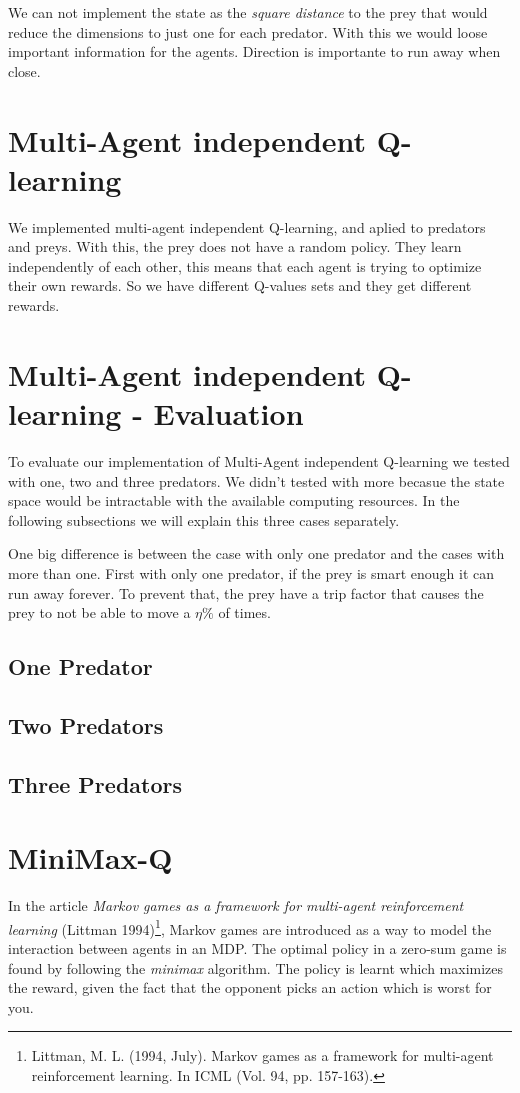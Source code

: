 \documentclass{article}
\begin{document}
We can not implement the state as the \emph{square distance} to the prey that
would reduce the dimensions to just one for each predator. With this we would
loose important information for the agents. Direction is importante to run away
when close.

\section{Multi-Agent independent Q-learning}
We implemented multi-agent independent Q-learning, and aplied to predators and
preys. With this, the prey does not have a random policy. They learn
independently of each other, this means that each agent is trying to optimize
their own rewards. So we have different Q-values sets and they get different
rewards.

\section{Multi-Agent independent Q-learning - Evaluation}
To evaluate our implementation of Multi-Agent independent Q-learning we tested
with one, two and three predators. We didn't tested with more becasue the state
space would be intractable with the available computing resources. In the
following subsections we will explain this three cases separately.

One big difference is between the case with only one predator and the cases with
more than one. First with only one predator, if the prey is smart enough it can
run away forever. To prevent that, the prey have a trip factor that causes the
prey to not be able to move a $\eta\%$ of times.

\subsection{One Predator}



\subsection{Two Predators}



\subsection{Three Predators}



\section{MiniMax-Q}
In the article \emph{Markov games as a framework for multi-agent reinforcement learning} (Littman 1994)\footnote{Littman, M. L. (1994, July). Markov games as a framework for multi-agent reinforcement learning. In ICML (Vol. 94, pp. 157-163).}, Markov games are introduced as a way to model the interaction between agents in an MDP. The optimal policy in a zero-sum game is found by following the \emph{minimax} algorithm. The policy is learnt which maximizes the reward, given the fact that the opponent picks an action which is worst for you.
\end{document}
